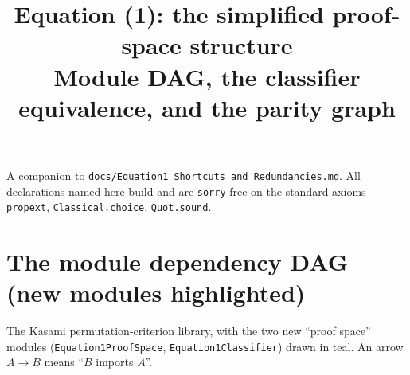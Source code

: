 \documentclass[11pt]{article}
\title{\bfseries Equation (1): the simplified proof-space structure\\[2pt]
\large Module DAG, the classifier equivalence, and the parity graph}
\author{}
\date{}
\newcommand{\lst}[1]{{\small\texttt{#1}}}
\theoremstyle{definition}
\begin{document}
\maketitle
\vspace{-2.2em}

\begin{center}
\small A companion to \lst{docs/Equation1\_Shortcuts\_and\_Redundancies.md}.
All declarations named here build and are \lst{sorry}-free on the standard
axioms \lst{propext}, \lst{Classical.choice}, \lst{Quot.sound}.
\end{center}

\section{The module dependency DAG (new modules highlighted)}

The Kasami permutation-criterion library, with the two new ``proof space''
modules (\lst{Equation1ProofSpace}, \lst{Equation1Classifier}) drawn in teal.
An arrow $A\to B$ means ``$B$ imports $A$''.
\end{document}
